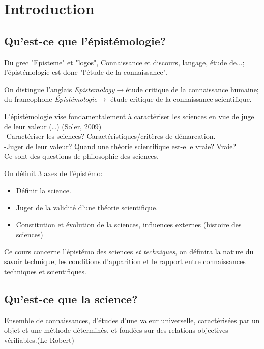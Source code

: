 \documentclass{report}
\begin{document}
	\clearpage
	
	
	\tableofcontents
	
	\chapter{Introduction}
	
	\section{Qu'est-ce que l'épistémologie?}
	
	Du grec "Episteme" et "logos", Connaissance et discours, langage, étude de...; l'épistémologie est donc "l'étude de la connaissance".
	
	On distingue l'anglais \emph{Epistemology}$\rightarrow$étude critique de la connaissance humaine; du francophone \emph{\'{E}pistémologie}$\rightarrow$ étude critique de la connaissance scientifique.
	
	\og L’épistémologie vise fondamentalement à caractériser les sciences en vue de juge de leur valeur (…) \fg	(Soler, 2009)\\
	-Caractériser les sciences? Caractéristiques/critères de démarcation.\\
	-Juger de leur valeur? Quand une théorie scientifique est-elle vraie? Vraie?\\
	Ce sont des questions de philosophie des sciences.
	
	On définit 3 axes de l'épistémo:
	\begin{itemize}
		\item Définir la science.
		\item Juger de la validité d'une théorie scientifique.
		\item Constitution et évolution de la sciences, influences externes (histoire des sciences)
	\end{itemize}
	
	Ce cours concerne l'épistémo des sciences \emph{et techniques}, on définira la nature du savoir technique, les conditions d'apparition et le rapport entre connaissances techniques et scientifiques.
	
	\section{Qu'est-ce que la science?}
	
	\og Ensemble de connaissances, d’études d’une valeur universelle, caractérisées par un objet et une méthode déterminés, et fondées sur des relations objectives vérifiables.\fg (Le Robert)
	
\end{document}
